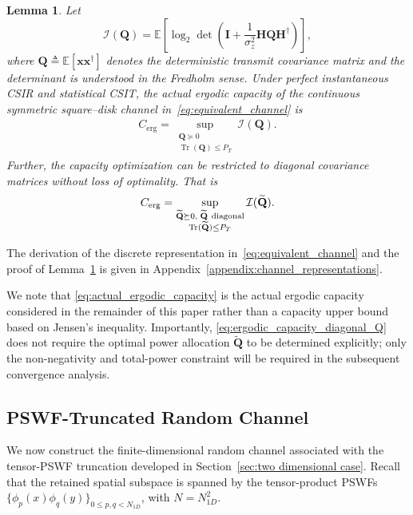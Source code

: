 \documentclass[lettersize,journal]{IEEEtran}
\theoremstyle{plain}
\newtheorem{lemma}{Lemma}
\begin{document}
\begin{lemma}
	\label{lemma:continuous_capacity}
	Let 
	\begin{equation}
		\mathcal{I}(\mathbf{Q}) = \mathbb{E}\left[\log_2\det\left(
		\mathbf{I}
		+
		\frac{1}{\sigma_z^2}
		\mathbf{H}\mathbf{Q}\mathbf{H}^{\dagger}
		\right)
		\right],
		\label{eq:I_Q_Definition}
	\end{equation}
	where $\mathbf{Q} \triangleq \mathbb{E}[\mathbf{x}\mathbf{x}^{\dagger}]$ denotes the deterministic transmit covariance matrix and the determinant is understood in the Fredholm sense. Under perfect instantaneous CSIR and statistical CSIT, 
	the actual ergodic capacity of the continuous
	symmetric square--disk channel in~\eqref{eq:equivalent_channel} is
	\begin{align}
		C_{\mathrm{erg}}
		=
		\sup_{\substack{
				\mathbf{Q}\succeq0\\
				\operatorname{Tr}(\mathbf{Q})\leq P_T
		}}
		\mathcal{I}(\mathbf{Q}).
		\label{eq:actual_ergodic_capacity}
	\end{align}
	Further, the capacity optimization can be restricted to diagonal covariance
	matrices without loss of optimality. That is
	\begin{align}
		C_{\mathrm{erg}}
		=
		\sup_{\substack{
				\widetilde{\mathbf{Q}}\succeq0,\;
				\widetilde{\mathbf{Q}}\ {\rm diagonal}\\
				\operatorname{Tr}(\widetilde{\mathbf{Q}})\leq P_T
		}}
		\mathcal{I}(\widetilde{\mathbf{Q}}).
		\label{eq:ergodic_capacity_diagonal_Q}
	\end{align}
\end{lemma}
The derivation of the discrete representation in~\eqref{eq:equivalent_channel} and the proof of Lemma~\ref{lemma:continuous_capacity} is given in Appendix~\ref{appendix:channel_representations}.

We note that \eqref{eq:actual_ergodic_capacity} is the actual ergodic capacity considered in the remainder of this paper rather than a capacity upper bound based on Jensen's inequality. Importantly, \eqref{eq:ergodic_capacity_diagonal_Q} does
not require the optimal power allocation $\widetilde{\mathbf{Q}}$ to
be determined explicitly; only the non-negativity and total-power
constraint will be required in the subsequent convergence analysis.

\subsection{PSWF-Truncated Random Channel}
We now construct the finite-dimensional random channel associated
with the tensor-PSWF truncation developed in
Section~\ref{sec:two dimensional case}. Recall that the retained
spatial subspace is spanned by the tensor-product PSWFs
$\{\phi_p(x)\phi_q(y)\}_{0\leq p,q<N_{1D}}$, with
$N=N_{1D}^2$. 
\end{document}
